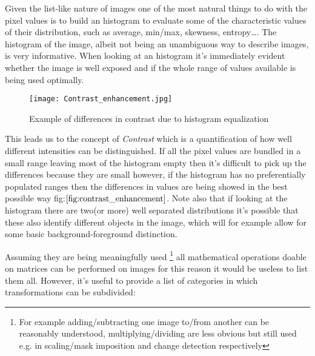 Given the list-like nature of images one of the most natural things to do with the pixel values is to build an histogram to evaluate some of the characteristic values of their distribution, such as average, min/max, skewness, entropy\ldots. The histogram of the image, albeit not being an unambiguous way to describe images, is very informative. When looking at an histogram it's immediately evident whether the image is well exposed and if the whole range of values available is being used optimally.

\begin{figure}[H]
  		\texttt{[image: Contrast\_enhancement.jpg]}
        \caption{Example of differences in contrast due to histogram equalization\label{fig:contrast_enhancement}}
\end{figure}

This leads us to the concept of \textit{Contrast} which is a quantification of how well different intensities can be distinguished. If all the pixel values are bundled in a small range leaving most of the histogram empty then it's difficult to pick up the differences because they are small however, if the histogram has no preferentially populated ranges then the differences in values are being showed in the best possible way fig:$\ref{fig:contrast_enhancement}$. Note also that if looking at the histogram there are two(or more) well separated distributions it's possible that these also identify different objects in the image, which will for example allow for some basic background-foreground distinction.

Assuming they are being meaningfully used \footnote{For example adding/subtracting one image to/from another can be reasonably understood, multiplying/dividing are less obvious but still used e.g. in scaling/mask imposition and change detection respectively} all mathematical operations doable on matrices can be performed on images for this reason it would be useless to list them all. However, it's useful to provide a list of categories in which transformations can be subdivided:

